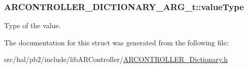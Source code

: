 \subsubsection[{\texorpdfstring{value\+Type}{valueType}}]{ A\+R\+C\+O\+N\+T\+R\+O\+L\+L\+E\+R\+\_\+\+D\+I\+C\+T\+I\+O\+N\+A\+R\+Y\+\_\+\+A\+R\+G\+\_\+t\+::value\+Type}\hypertarget{struct_a_r_c_o_n_t_r_o_l_l_e_r___d_i_c_t_i_o_n_a_r_y___a_r_g__t_a4f739d755b914a9f7b36d8140bc4470d}{}\label{struct_a_r_c_o_n_t_r_o_l_l_e_r___d_i_c_t_i_o_n_a_r_y___a_r_g__t_a4f739d755b914a9f7b36d8140bc4470d}
Type of the value. 

The documentation for this struct was generated from the following file\+:\begin{DoxyCompactItemize}
\item 
src/hal/pb2/include/lib\+A\+R\+Controller/\hyperlink{_a_r_c_o_n_t_r_o_l_l_e_r___dictionary_8h}{A\+R\+C\+O\+N\+T\+R\+O\+L\+L\+E\+R\+\_\+\+Dictionary.\+h}\end{DoxyCompactItemize}
